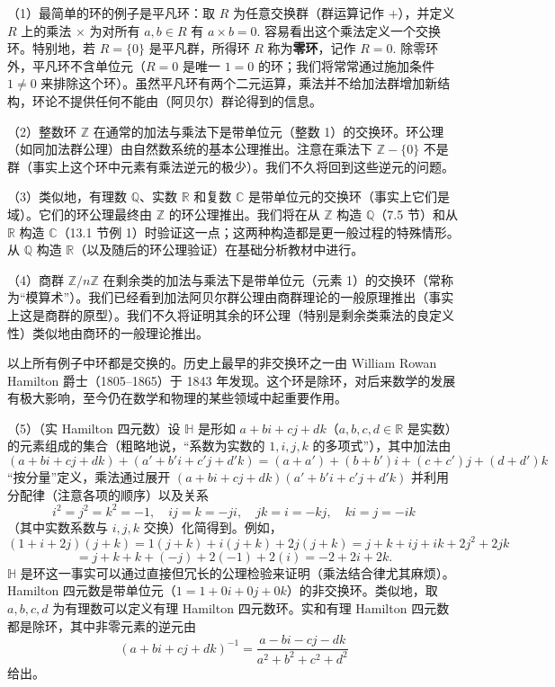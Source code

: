 \begin{example}
（1）最简单的环的例子是平凡环：取 \(R\) 为任意交换群（群运算记作 \(+\)），并定义 \(R\) 上的乘法 \(\times\) 为对所有 \(a, b \in R\) 有 \(a \times b = 0\). 容易看出这个乘法定义一个交换环。特别地，若 \(R = \{0\}\) 是平凡群，所得环 \(R\) 称为\textbf{零环}，记作 \(R = 0\). 除零环外，平凡环不含单位元（\(R = 0\) 是唯一 \(1 = 0\) 的环；我们将常常通过施加条件 \(1 \neq 0\) 来排除这个环）。虽然平凡环有两个二元运算，乘法并不给加法群增加新结构，环论不提供任何不能由（阿贝尔）群论得到的信息。

（2）整数环 \(\mathbb{Z}\) 在通常的加法与乘法下是带单位元（整数 1）的交换环。环公理（如同加法群公理）由自然数系统的基本公理推出。注意在乘法下 \(\mathbb{Z} - \{0\}\) 不是群（事实上这个环中元素有乘法逆元的极少）。我们不久将回到这些逆元的问题。

（3）类似地，有理数 \(\mathbb{Q}\)、实数 \(\mathbb{R}\) 和复数 \(\mathbb{C}\) 是带单位元的交换环（事实上它们是域）。它们的环公理最终由 \(\mathbb{Z}\) 的环公理推出。我们将在从 \(\mathbb{Z}\) 构造 \(\mathbb{Q}\)（7.5 节）和从 \(\mathbb{R}\) 构造 \(\mathbb{C}\)（13.1 节例 1）时验证这一点；这两种构造都是更一般过程的特殊情形。从 \(\mathbb{Q}\) 构造 \(\mathbb{R}\)（以及随后的环公理验证）在基础分析教材中进行。

（4）商群 \(\mathbb{Z}/n\mathbb{Z}\) 在剩余类的加法与乘法下是带单位元（元素 1）的交换环（常称为“模算术”）。我们已经看到加法阿贝尔群公理由商群理论的一般原理推出（事实上这是商群的原型）。我们不久将证明其余的环公理（特别是剩余类乘法的良定义性）类似地由商环的一般理论推出。

以上所有例子中环都是交换的。历史上最早的非交换环之一由 William Rowan Hamilton 爵士（1805--1865）于 1843 年发现。这个环是除环，对后来数学的发展有极大影响，至今仍在数学和物理的某些领域中起重要作用。

（5）（实 Hamilton 四元数）设 \(\mathbb{H}\) 是形如 \(a + bi + cj + dk\)（\(a, b, c, d \in \mathbb{R}\) 是实数）的元素组成的集合（粗略地说，“系数为实数的 \(1, i, j, k\) 的多项式”），其中加法由
\[
(a + bi + cj + dk) + (a' + b'i + c'j + d'k) = (a+a') + (b+b')i + (c+c')j + (d+d')k
\]
“按分量”定义，乘法通过展开 \((a+bi+cj+dk)(a'+b'i+c'j+d'k)\) 并利用分配律（注意各项的顺序）以及关系
\[
i^2 = j^2 = k^2 = -1, \quad ij = k = -ji,\quad jk = i = -kj,\quad ki = j = -ik
\]
（其中实数系数与 \(i, j, k\) 交换）化简得到。例如，
\[
(1+i+2j)(j+k) = 1(j+k) + i(j+k) + 2j(j+k) = j+k+ij+ik+2j^2+2jk
\]
\[
= j+k+k+(-j)+2(-1)+2(i) = -2+2i+2k.
\]
\(\mathbb{H}\) 是环这一事实可以通过直接但冗长的公理检验来证明（乘法结合律尤其麻烦）。Hamilton 四元数是带单位元（\(1 = 1+0i+0j+0k\)）的非交换环。类似地，取 \(a, b, c, d\) 为有理数可以定义有理 Hamilton 四元数环。实和有理 Hamilton 四元数都是除环，其中非零元素的逆元由
\[
(a+bi+cj+dk)^{-1} = \frac{a - bi - cj - dk}{a^2+b^2+c^2+d^2}
\]
给出。


\end{example}
